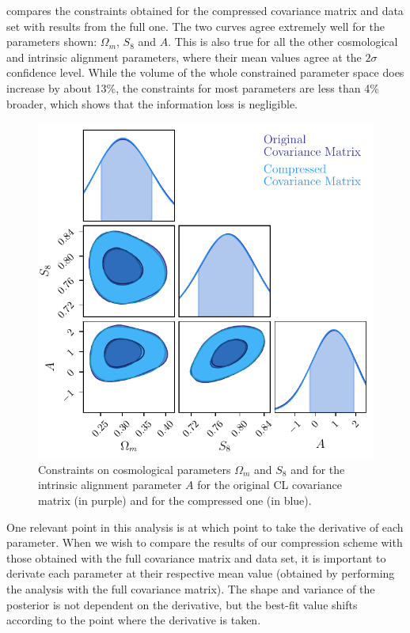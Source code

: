 \documentclass[twocolumn]{\docclass}
\begin{document}
	 compares the constraints obtained for the compressed covariance matrix and data set with results from the full one. The two curves agree extremely well for the parameters shown: $\Omega_m$, $S_8$ and $A$. This is also true for all the other cosmological and intrinsic alignment parameters, where their mean values agree at the $2 \sigma$ confidence level. While the volume of the whole constrained parameter space does increase by about 13\%, the constraints for most parameters are less than 4\% broader, which shows that the information loss is negligible. 
	
	\begin{figure}
		\includegraphics[width=0.9\columnwidth]{Compression/Compressed_omS8A.pdf}
		\caption{Constraints on cosmological parameters $\Omega_m$ and $S_8$ and for the intrinsic alignment parameter $A$ for the original CL covariance matrix (in purple) and for the compressed one (in blue). \label{fig:compressiony1}}
	\end{figure}
	
	One relevant point in this analysis is at which point to take the derivative of each parameter. When we wish to compare the results of our compression scheme with those obtained with the full covariance matrix and data set, it is important to derivate each parameter at their respective mean value (obtained by performing the analysis with the full covariance matrix). The shape and variance of the posterior is not dependent on the derivative, but the best-fit value shifts according to the point where the derivative is taken.
	
\end{document}

